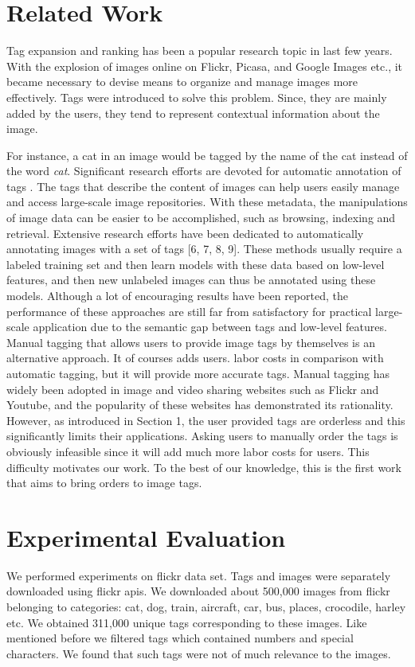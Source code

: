 \documentclass[12pt]{article}
\begin{document}
\section{Related Work}
Tag expansion and ranking has been a popular research topic in last few years. With the explosion of
images online on Flickr, Picasa, and Google Images etc., it became necessary to devise means to 
organize and manage images more effectively. Tags were introduced to solve this problem. Since,
they are mainly added by the users, they tend to represent contextual information about the image.

For instance, a cat in an image would be tagged by the name of the cat instead of the word \emph{cat}.
Significant research efforts are devoted for automatic annotation of tags .
The tags that describe the content of images can help
users easily manage and access large-scale image repositories.
With these metadata, the manipulations of image data
can be easier to be accomplished, such as browsing, indexing
and retrieval. Extensive research efforts have been dedicated
to automatically annotating images with a set of tags [6, 7,
8, 9]. These methods usually require a labeled training set
and then learn models with these data based on low-level features,
and then new unlabeled images can thus be annotated
using these models. Although a lot of encouraging results
have been reported, the performance of these approaches
are still far from satisfactory for practical large-scale application
due to the semantic gap between tags and low-level
features. Manual tagging that allows users to provide image
tags by themselves is an alternative approach. It of courses
adds users. labor costs in comparison with automatic tagging,
but it will provide more accurate tags. Manual tagging
has widely been adopted in image and video sharing websites
such as Flickr and Youtube, and the popularity of these
websites has demonstrated its rationality. However, as introduced
in Section 1, the user provided tags are orderless
and this significantly limits their applications. Asking users
to manually order the tags is obviously infeasible since it
will add much more labor costs for users. This difficulty
motivates our work. To the best of our knowledge, this is
the first work that aims to bring orders to image tags.

\section{Experimental Evaluation}
We performed experiments on flickr data set. Tags and images were separately downloaded using
flickr apis. We downloaded about 500,000 images from flickr belonging to categories: cat,
dog, train, aircraft, car, bus, places, crocodile, harley etc. We obtained 311,000 unique tags
corresponding to these images. Like mentioned before we filtered tags which contained numbers
and special characters. We found that such tags were not of much relevance to the images.
\end{document}
